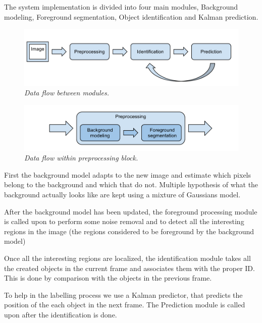 The system implementation is divided into four main modules, Background modeling, Foreground segmentation, Object identification and Kalman prediction. 


\begin{figure}[htb]
	\centering
	\includegraphics[width=\linewidth]{images/data_flow.png}
	\caption{\textit{Data flow between modules.}}
	\label{fig:block_overview_fig}  %
\end{figure}

\begin{figure}[htb]
	\centering
	\includegraphics[width=\linewidth]{images/data_flow_preprocessing.png}
	\caption{\textit{Data flow within preprocessing block.}}
	\label{fig:block_overview2_fig}  %
\end{figure}


First the background model adapts to the new image and estimate which pixels belong to the background and which that do not. Multiple hypothesis of what the background actually looks like are kept using a mixture of Gaussians model.

After the background model has been updated, the foreground processing module is called upon to perform some noise removal and to detect all the interesting regions in the image (the regions considered to be foreground by the background model)

Once all the interesting regions are localized, the identification module takes all the created objects in the current frame and associates them with the proper ID. This is done by comparison with the objects in the previous frame.

To help in the labelling process we use a Kalman predictor, that predicts the position of the each object in the next frame. The Prediction module is called upon after the identification is done.
